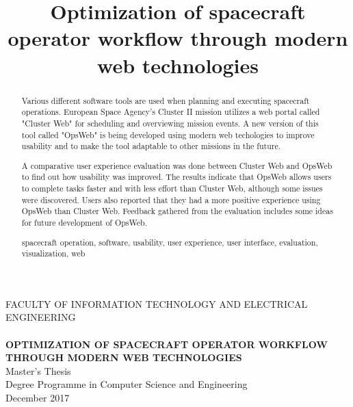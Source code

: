 \documentclass[a4paper, 12pt,titlepage]{dithesis}
\title{Optimization of spacecraft operator workflow through modern web technologies}
\begin{document}
\begin{titlepage}
	{\sffamily\fontsize{9}{1pt}\selectfont FACULTY OF INFORMATION TECHNOLOGY AND ELECTRICAL ENGINEERING\\}
	\vspace{65 mm}
	{\textbf{\fontsize{16}{19pt}\selectfont \getfirstname\ \getlastname }\\}
	\vspace{15 mm}
	{\textbf{\fontsize{18}{22pt}\selectfont OPTIMIZATION OF SPACECRAFT OPERATOR WORKFLOW THROUGH MODERN WEB TECHNOLOGIES\\}}
	\vspace{53 mm}
	{\fontsize{14}{17}\selectfont Master's Thesis \\Degree Programme in Computer Science and Engineering \\ December 2017\\}
\end{titlepage}


\begin{abstract}
Various different software tools are used when planning and executing spacecraft operations. European Space Agency's Cluster II mission utilizes a web portal called "Cluster Web" for scheduling and overviewing mission events. A new version of this tool called "OpsWeb" is being developed using modern web techologies to improve usability and to make the tool adaptable to other missions in the future. 

A comparative user experience evaluation was done between Cluster Web and OpsWeb to find out how usability was improved. The results indicate that OpsWeb allows users to complete tasks faster and with less effort than Cluster Web, although some issues were discovered. Users also reported that they had a more positive experience using OpsWeb than Cluster Web. Feedback gathered from the evaluation includes some ideas for future development of OpsWeb.

\keywords spacecraft operation, software, usability, user experience, user interface, evaluation, visualization, web

\end{abstract}
\end{document}
